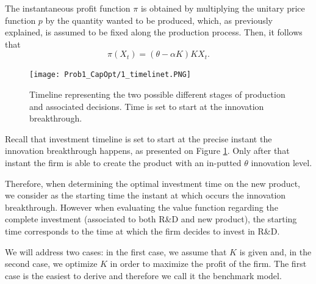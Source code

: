 The instantaneous profit function $\pi$ is obtained by multiplying the unitary price function $p$ by the quantity wanted to be produced, which, as previously explained, is assumed to be fixed along the production process. Then, it follows that
\begin{equation}
\pi(X_t)=(\theta-\alpha K)K X_t.
\label{prob1:pi}
\end{equation}

\begin{figure}[!htb]
	\centering
	\texttt{[image: Prob1\_CapOpt/1\_timelinet.PNG]}
	\caption{Timeline representing the two possible different stages of production and associated decisions. Time is set to start at the innovation breakthrough.}
	\label{1_time}
\end{figure}

Recall that investment timeline is set to start at the precise instant the innovation breakthrough happens, as presented on Figure \ref{1_time}. Only after that instant the firm is able to create the product with an in-putted $\theta$ innovation level.







Therefore, when determining the optimal investment time on the new product, we consider as the starting time the instant at which occurs the innovation breakthrough. However when evaluating the value function regarding the complete investment (associated to both R\&D and new product), the starting time corresponds to the time at which the firm decides to invest in R\&D.







We will address two cases: in the first case, we assume that $K$ is given and, in the second case, we optimize $K$ in order to maximize the profit of the firm. The first case is the easiest to derive and therefore we call it the benchmark model.



